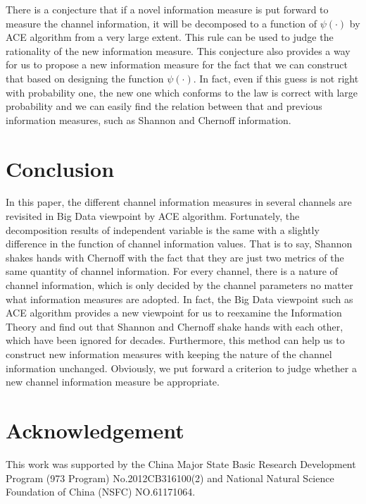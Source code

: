 \documentclass[conference]{IEEEtran}
\begin{document}
There is a conjecture that if a novel information measure is put forward to measure the channel information, it will be decomposed to a function of $\psi(\cdot)$ by ACE algorithm from a very large extent. This rule can be used to judge the rationality of the new information measure. This conjecture also provides a way for us to propose a new information measure for the fact that we can construct that based on designing the function $\psi(\cdot)$. In fact, even if this guess is not right with probability one, the new one which conforms to the law is correct with large probability and we can easily find the relation between that and previous information measures, such as Shannon and Chernoff information.

\section{Conclusion}
In this paper, the different channel information measures in several channels are revisited in Big Data viewpoint by ACE algorithm. Fortunately, the decomposition results of independent variable is the same with a slightly difference in the function of channel information values. That is to say, Shannon shakes hands with Chernoff with the fact that they are just two metrics of the same quantity of channel information. For every channel, there is a nature of channel information, which is only decided by the channel parameters no matter what information measures are adopted. In fact, the Big Data viewpoint such as ACE algorithm provides a new viewpoint for us to reexamine the Information Theory and find out that Shannon and Chernoff shake hands with each other, which have been ignored for decades. Furthermore, this method can help us to construct new information measures with keeping the nature of the channel information unchanged. Obviously, we put forward a criterion to judge whether a new channel information measure be appropriate.

\section*{Acknowledgement}
This work was supported by the China Major State Basic Research Development Program (973 Program) No.2012CB316100(2) and National Natural Science Foundation of China (NSFC) NO.61171064.
\end{document}
